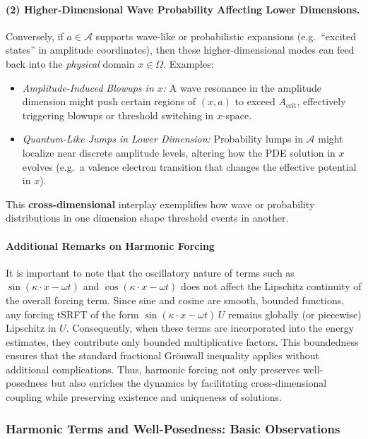 \documentclass[12pt]{article}
\begin{document}
\paragraph{(2) Higher-Dimensional Wave Probability Affecting Lower Dimensions.}
Conversely, if $a\in\mathcal{A}$ supports wave-like or probabilistic expansions 
(e.g.\ “excited states” in amplitude coordinates), then these higher-dimensional modes 
can feed back into the \emph{physical} domain $x\in\Omega$. Examples:
\begin{itemize}
  \item \emph{Amplitude-Induced Blowups in $x$:} 
        A wave resonance in the amplitude dimension might push certain regions of 
        $(x,a)$ to exceed $A_{\mathrm{crit}}$, effectively triggering blowups or 
        threshold switching in $x$-space. 
  \item \emph{Quantum-Like Jumps in Lower Dimension:} 
        Probability lumps in $\mathcal{A}$ might localize near discrete amplitude levels, 
        altering how the PDE solution in $x$ evolves (e.g.\ a valence electron transition 
        that changes the effective potential in $x$).
\end{itemize}
This \textbf{cross-dimensional} interplay exemplifies how wave or probability distributions 
in one dimension shape threshold events in another.

\paragraph{Additional Remarks on Harmonic Forcing}\label{sec:harmonic_forcing}
It is important to note that the oscillatory nature of terms such as 
\(\sin(\kappa \cdot x - \omega t)\) and \(\cos(\kappa \cdot x - \omega t)\) does not affect the Lipschitz continuity of the overall forcing term. Since sine and cosine are smooth, bounded functions, any forcing tSRFT of the form \(\sin(\kappa \cdot x - \omega t)\,U\) remains globally (or piecewise) Lipschitz in \(U\). Consequently, when these terms are incorporated into the energy estimates, they contribute only bounded multiplicative factors. This boundedness ensures that the standard fractional Grönwall inequality applies without additional complications. Thus, harmonic forcing not only preserves well-posedness but also enriches the dynamics by facilitating cross-dimensional coupling while preserving existence and uniqueness of solutions.

\subsubsection{Harmonic Terms and Well-Posedness: Basic Observations}
\end{document}
